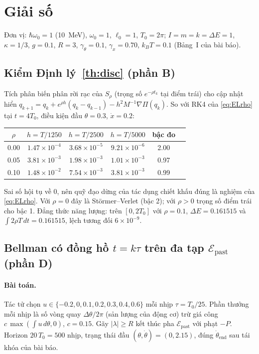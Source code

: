 \documentclass[11pt,a4paper]{article}
\newcommand{\Epast}{\mathcal{E}_{\text{past}}}
\theoremstyle{remark}
\begin{document}
\section{Giải số}
Đơn vị: $\hbar\omega_0=1$ (10~MeV), $\omega_0=1$, $\ell_0=1$, $T_0=2\pi$; $I=m=k=\Delta E=1$, $\kappa=1/3$, $g=0.1$, $R=3$, $\gamma_\theta=0.1$, $\gamma_x=0.70$, $k_BT=0.1$ (Bảng~I của bài báo).

\subsection{Kiểm Định lý~\ref{th:disc} (phần B)}
Tích phân biến phân rời rạc của $S_\rho$ (trọng số $e^{-\rho t_k}$ tại điểm trái) cho cập nhật hiển
$q_{k+1}=q_k+e^{\rho h}(q_k-q_{k-1})-h^2M^{-1}\nabla\Pi(q_k)$. So với RK4 của \eqref{eq:ELrho} tại $t=4T_0$, điều kiện đầu $\theta=0.3$, $\dot x=0.2$:

\begin{center}
\begin{tabular}{cccccc}
\toprule
$\rho$ & $h=T/1250$ & $h=T/2500$ & $h=T/5000$ & bậc đo \\
\midrule
0.00 & $1.47\times10^{-4}$ & $3.68\times10^{-5}$ & $9.21\times10^{-6}$ & 2.00 \\
0.05 & $3.81\times10^{-3}$ & $1.98\times10^{-3}$ & $1.01\times10^{-3}$ & 0.97 \\
0.10 & $1.48\times10^{-2}$ & $7.54\times10^{-3}$ & $3.81\times10^{-3}$ & 0.99 \\
\bottomrule
\end{tabular}
\end{center}
Sai số hội tụ về 0, nên quỹ đạo dừng của tác dụng chiết khấu đúng là nghiệm của \eqref{eq:ELrho}. Với $\rho=0$ đây là Störmer--Verlet (bậc 2); với $\rho>0$ trọng số điểm trái cho bậc 1. Đẳng thức năng lượng: trên $[0,2T_0]$ với $\rho=0.1$, $\Delta E=0.161515$ và $\int2\rho T\,dt=0.161515$, lệch tương đối $6\times10^{-9}$.

\subsection{Bellman có đồng hồ $t=k\tau$ trên đa tạp $\Epast$ (phần D)}
\paragraph{Bài toán.} Tác tử chọn $u\in\{-0.2,0,0.1,0.2,0.3,0.4,0.6\}$ mỗi nhịp $\tau=T_0/25$. Phần thưởng mỗi nhịp là số vòng quay $\Delta\theta/2\pi$ (sản lượng của động cơ) trừ giá công $c\,\max(\int u\,d\theta,0)$, $c=0.15$. Gãy $|\lambda|\ge R$ kết thúc pha $\Epast$ với phạt $-P$. Horizon $20\,T_0=500$ nhịp, trạng thái đầu $(\theta,\dot\theta)=(0,2.15)$, đúng $\dot\theta_{\text{end}}$ sau tái khóa của bài báo.
\end{document}
